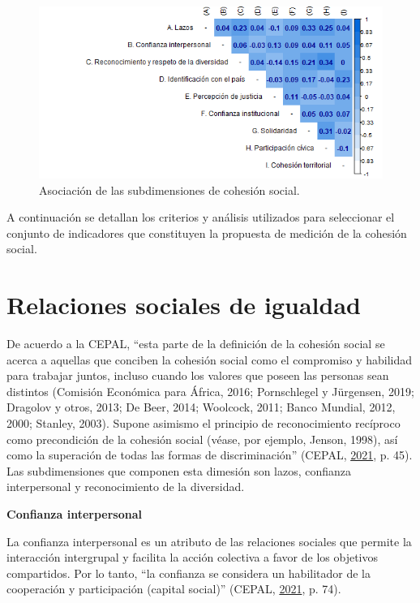 \documentclass[
  12pt,
]{book}
\begin{document}
\begin{figure}[H]

{\centering \includegraphics[width=1\linewidth,height=1\textheight]{output/graphs/cohesion_social_cor} 

}

\caption{Asociación de las subdimensiones de cohesión social.}\label{fig:cohesion-social-cor}
\end{figure}

A continuación se detallan los criterios y análisis utilizados para seleccionar el conjunto de indicadores que constituyen la propuesta de medición de la cohesión social.

\hypertarget{relaciones-sociales-de-igualdad}{%
\section{Relaciones sociales de igualdad}\label{relaciones-sociales-de-igualdad}}

De acuerdo a la CEPAL, ``esta parte de la definición de la cohesión social se acerca a aquellas que conciben la cohesión social como el compromiso y habilidad para trabajar juntos, incluso cuando los valores que poseen las personas sean distintos (Comisión Económica para África, 2016; Pornschlegel y Jürgensen, 2019; Dragolov y otros, 2013; De Beer, 2014; Woolcock, 2011; Banco Mundial, 2012, 2000; Stanley, 2003). Supone asimismo el principio de reconocimiento recíproco como precondición de la cohesión social (véase, por ejemplo, Jenson, 1998), así como la superación de todas las formas de discriminación'' (CEPAL, \protect\hyperlink{ref-cepal_cohesion_2021}{2021}, p. 45). Las subdimensiones que componen esta dimesión son lazos, confianza interpersonal y reconocimiento de la diversidad.

\textbf{Confianza interpersonal}

La confianza interpersonal es un atributo de las relaciones sociales que permite la interacción intergrupal y facilita la acción colectiva a favor de los objetivos compartidos. Por lo tanto, ``la confianza se considera un habilitador de la cooperación y participación (capital social)'' (CEPAL, \protect\hyperlink{ref-cepal_cohesion_2021}{2021}, p. 74).
\end{document}
